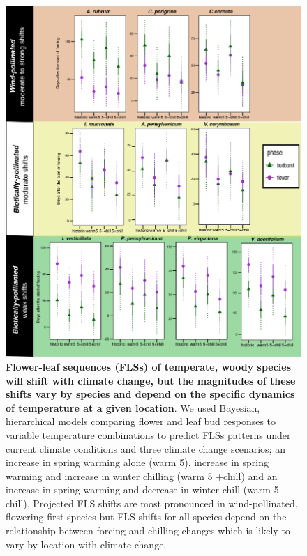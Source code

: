 \documentclass[11pt]{article}
\begin{document}
    \begin{figure}[h!]
    \centering
 \includegraphics[width=\textwidth]{..//Plots/Flobuds_manuscript_figs/climpredictions.jpg}
    \caption{\textbf{Flower-leaf sequences (FLSs) of temperate, woody species will shift with climate change, but the magnitudes of these shifts vary by species and depend on the specific dynamics of temperature at a given location}. We used Bayesian, hierarchical models comparing flower and leaf bud responses to variable temperature combinations to predict FLSs patterns under current climate conditions and three climate change scenarios;  an increase in spring warming alone (warm 5), increase in spring warming and increase in winter chilling (warm 5 +chill) and an increase in spring warming and decrease in winter chill (warm 5 -chill). Projected FLS shifts are most pronounced in wind-pollinated, flowering-first species but FLS shifts for all species depend on the relationship between forcing and chilling changes which is likely to vary by location with climate change.}
    \label{fig:preddy}
\end{figure}
\end{document}
